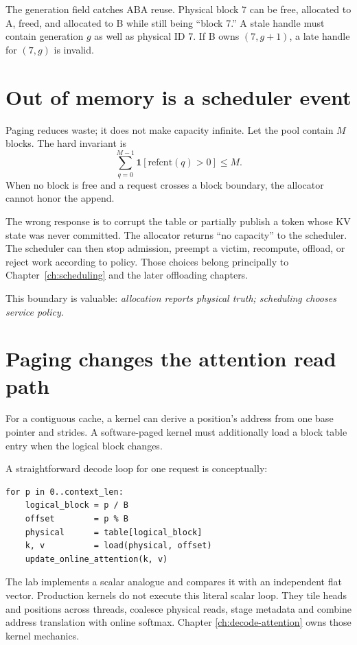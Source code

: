 The generation field catches ABA reuse. Physical block 7 can be free, allocated
to A, freed, and allocated to B while still being ``block 7.'' A stale handle
must contain generation $g$ as well as physical ID 7. If B owns $(7,g+1)$, a
late handle for $(7,g)$ is invalid.

\section{Out of memory is a scheduler event}

Paging reduces waste; it does not make capacity infinite. Let the pool contain
$M$ blocks. The hard invariant is
\[
 \sum_{q=0}^{M-1}\mathbf 1[\mathrm{refcnt}(q)>0]\le M.
\]
When no block is free and a request crosses a block boundary, the allocator
cannot honor the append.

The wrong response is to corrupt the table or partially publish a token whose
KV state was never committed. The allocator returns ``no capacity'' to the
scheduler. The scheduler can then stop admission, preempt a victim, recompute,
offload, or reject work according to policy. Those choices belong principally
to Chapter~\ref{ch:scheduling} and the later offloading chapters.

This boundary is valuable: \emph{allocation reports physical truth; scheduling
chooses service policy.}

\section{Paging changes the attention read path}

For a contiguous cache, a kernel can derive a position's address from one base
pointer and strides. A software-paged kernel must additionally load a block
table entry when the logical block changes.

A straightforward decode loop for one request is conceptually:

\begin{verbatim}
for p in 0..context_len:
    logical_block = p / B
    offset        = p % B
    physical      = table[logical_block]
    k, v          = load(physical, offset)
    update_online_attention(k, v)
\end{verbatim}

The lab implements a scalar analogue and compares it with an independent flat
vector. Production kernels do not execute this literal scalar loop. They tile
heads and positions across threads, coalesce physical reads, stage metadata
and combine address translation with online softmax. Chapter
\ref{ch:decode-attention} owns those kernel mechanics.

